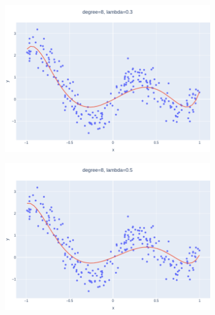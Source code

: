 \documentclass[14pt,a4]{article}
\begin{document}
\begin{figure}[h]
\begin{subfigure}{0.3\textwidth}
    \end{subfigure}
    \hfill
    \begin{subfigure}{0.3\linewidth}
        \centering
        \includegraphics[width=\textwidth]{images/implementation/q1/part_e/0.3.png}
    \end{subfigure}
    \newline
    \begin{subfigure}{0.3\linewidth}
        \centering
        \includegraphics[width=\textwidth]{images/implementation/q1/part_e/0.5.png}
    \end{subfigure}
    \hfill
    \begin{subfigure}{0.3\textwidth}
        \centering

\end{subfigure}
\end{figure}
\end{document}
